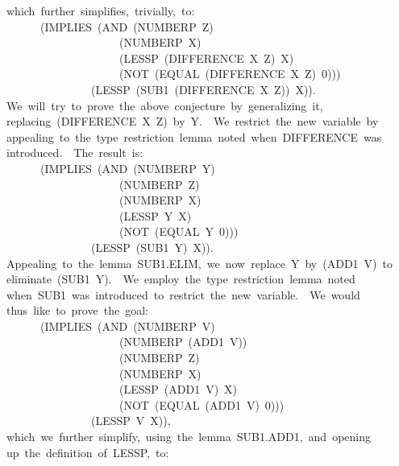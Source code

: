 \documentclass[11pt]{book}
\newenvironment{pubasis}{\begin{flushleft}\ttfamily\small}{\normalsize\rmfamily\end{flushleft}}
\begin{document}
\begin{pubasis}
~~which~further~simplifies,~trivially,~to:\\

~~~~~~~~(IMPLIES~(AND~(NUMBERP~Z)\\
~~~~~~~~~~~~~~~~~~~~~~(NUMBERP~X)\\
~~~~~~~~~~~~~~~~~~~~~~(LESSP~(DIFFERENCE~X~Z)~X)\\
~~~~~~~~~~~~~~~~~~~~~~(NOT~(EQUAL~(DIFFERENCE~X~Z)~0)))\\
~~~~~~~~~~~~~~~~~(LESSP~(SUB1~(DIFFERENCE~X~Z))~X)).\\

~~We~will~try~to~prove~the~above~conjecture~by~generalizing~it,\\
~~replacing~(DIFFERENCE~X~Z)~by~Y.~~We~restrict~the~new~variable~by\\
~~appealing~to~the~type~restriction~lemma~noted~when~DIFFERENCE~was\\
~~introduced.~~The~result~is:\\

~~~~~~~~(IMPLIES~(AND~(NUMBERP~Y)\\
~~~~~~~~~~~~~~~~~~~~~~(NUMBERP~Z)\\
~~~~~~~~~~~~~~~~~~~~~~(NUMBERP~X)\\
~~~~~~~~~~~~~~~~~~~~~~(LESSP~Y~X)\\
~~~~~~~~~~~~~~~~~~~~~~(NOT~(EQUAL~Y~0)))\\
~~~~~~~~~~~~~~~~~(LESSP~(SUB1~Y)~X)).\\

~~Appealing~to~the~lemma~SUB1.ELIM,~we~now~replace~Y~by~(ADD1~V)~to\\
~~eliminate~(SUB1~Y).~~We~employ~the~type~restriction~lemma~noted\\
~~when~SUB1~was~introduced~to~restrict~the~new~variable.~~We~would\\
~~thus~like~to~prove~the~goal:\\

~~~~~~~~(IMPLIES~(AND~(NUMBERP~V)\\
~~~~~~~~~~~~~~~~~~~~~~(NUMBERP~(ADD1~V))\\
~~~~~~~~~~~~~~~~~~~~~~(NUMBERP~Z)\\
~~~~~~~~~~~~~~~~~~~~~~(NUMBERP~X)\\
~~~~~~~~~~~~~~~~~~~~~~(LESSP~(ADD1~V)~X)\\
~~~~~~~~~~~~~~~~~~~~~~(NOT~(EQUAL~(ADD1~V)~0)))\\
~~~~~~~~~~~~~~~~~(LESSP~V~X)),\\

~~which~we~further~simplify,~using~the~lemma~SUB1.ADD1,~and~opening\\
~~up~the~definition~of~LESSP,~to:\\


\end{pubasis}
\end{document}
